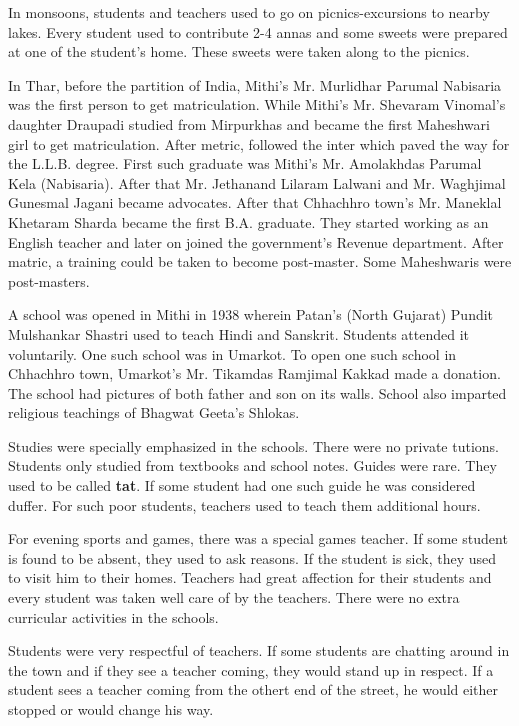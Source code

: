 In monsoons, students and teachers used to go on picnics-excursions to nearby
lakes. Every student used to contribute 2-4 annas and some sweets were prepared
at one of the student's home. These sweets were taken along to the picnics.

In Thar, before the partition of India, Mithi's Mr. Murlidhar Parumal Nabisaria
was the first person to get matriculation. While Mithi's Mr. Shevaram Vinomal's
daughter Draupadi studied from Mirpurkhas and became the first Maheshwari girl
to get matriculation. After metric, followed the inter which paved the way for
the L.L.B. degree. First such graduate was Mithi's Mr. Amolakhdas Parumal Kela
(Nabisaria). After that Mr. Jethanand Lilaram Lalwani and Mr. Waghjimal Gunesmal
Jagani became advocates. After that Chhachhro town's Mr. Maneklal Khetaram
Sharda became the first B.A. graduate. They started working as an English
teacher and later on joined the government's Revenue department. After matric, a
training could be taken to become post-master. Some Maheshwaris were
post-masters.

A school was opened in Mithi in 1938 wherein Patan's (North Gujarat) Pundit
Mulshankar Shastri used to teach Hindi and Sanskrit. Students attended it
voluntarily. One such school was in Umarkot. To open one such school in
Chhachhro town, Umarkot's Mr. Tikamdas Ramjimal Kakkad made a donation. The
school had pictures of both father and son on its walls. School also imparted
religious teachings of Bhagwat Geeta's Shlokas.

Studies were specially emphasized in the schools. There were no private tutions.
Students only studied from textbooks and school notes. Guides were rare. They
used to be called \textbf{tat}. If some student had one such guide he was
considered duffer. For such poor students, teachers used to teach them
additional hours.

For evening sports and games, there was a special games teacher. If some student
is found to be absent, they used  to ask reasons. If the student is sick, they
used to visit him to their homes. Teachers had great affection for their
students and every student was taken well care of by the teachers. There were no
extra curricular activities in the schools.

Students were very respectful of teachers. If some students are chatting around
in the town and if they see a teacher coming, they would stand up in respect. If
a student sees a teacher coming from the othert end of the street, he would either
stopped or would change his way.

